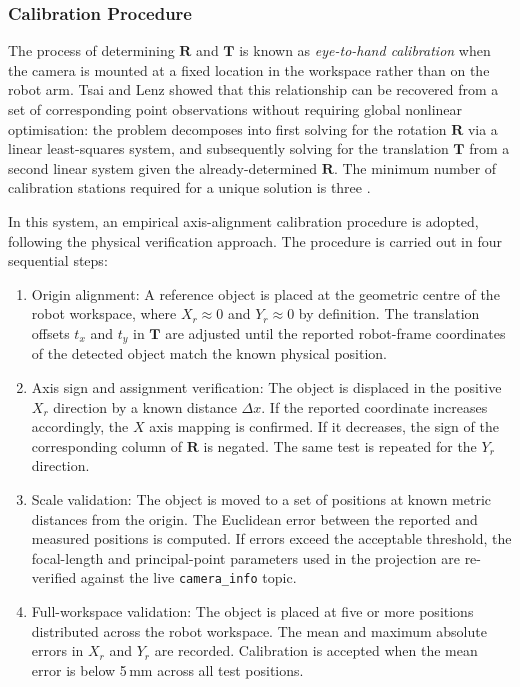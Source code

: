 \subsubsection{Calibration Procedure}
\hspace{1.27cm}
The process of determining $\mathbf{R}$ and $\mathbf{T}$ is
known as \textit{eye-to-hand calibration} when the camera is
mounted at a fixed location in the workspace rather than on the
robot arm. Tsai and Lenz \autocite{tsai-lenz-1989} showed that
this relationship can be recovered from a set of corresponding
point observations without requiring global nonlinear
optimisation: the problem decomposes into first solving for the
rotation $\mathbf{R}$ via a linear least-squares system, and
subsequently solving for the translation $\mathbf{T}$ from a
second linear system given the already-determined $\mathbf{R}$.
The minimum number of calibration stations required for a unique
solution is three \autocite{tsai-lenz-1989}.

\par
\hspace{1.27cm}
In this system, an empirical axis-alignment calibration procedure
is adopted, following the physical verification approach. The
procedure is carried out in four sequential steps:

\begin{enumerate}
    \item Origin alignment: A reference object is placed
    at the geometric centre of the robot workspace, where
    $X_r \approx 0$ and $Y_r \approx 0$ by definition. The
    translation offsets $t_x$ and $t_y$ in $\mathbf{T}$ are
    adjusted until the reported robot-frame coordinates of the
    detected object match the known physical position.

    \item Axis sign and assignment verification: The
    object is displaced in the positive $X_r$ direction by a
    known distance $\Delta x$. If the reported coordinate
    increases accordingly, the $X$ axis mapping is confirmed.
    If it decreases, the sign of the corresponding column of
    $\mathbf{R}$ is negated. The same test is repeated for the
    $Y_r$ direction.

    \item Scale validation: The object is moved to a
    set of positions at known metric distances from the origin.
    The Euclidean error between the reported and measured
    positions is computed. If errors exceed the acceptable
    threshold, the focal-length and principal-point parameters
    used in the projection are re-verified against the live
    \texttt{camera\_info} topic.

    \item Full-workspace validation: The object is
    placed at five or more positions distributed across the
    robot workspace. The mean and maximum absolute errors in
    $X_r$ and $Y_r$ are recorded. Calibration is accepted when
    the mean error is below 5\,mm across all test positions.
\end{enumerate}

